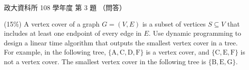 \begin{pastexam}[label={px:nccu-108-dsa-03}]{政大資科所 108 學年度 第 3 題}
（問答）

(15\%) A vertex cover of a graph $G=(V,E)$ is a subset of vertices $S\subseteq V$ that includes at
least one endpoint of every edge in $E$. Use dynamic programming to design a linear time algorithm
that outputs the smallest vertex cover in a tree. For example, in the following tree,
$\{\mathrm{A,C,D,F}\}$ is a vertex cover, and $\{\mathrm{C,E,F}\}$ is not a vertex cover. The
smallest vertex cover in the following tree is $\{\mathrm{B,E,G}\}$.
\begin{center}
\end{center}
\end{pastexam}

